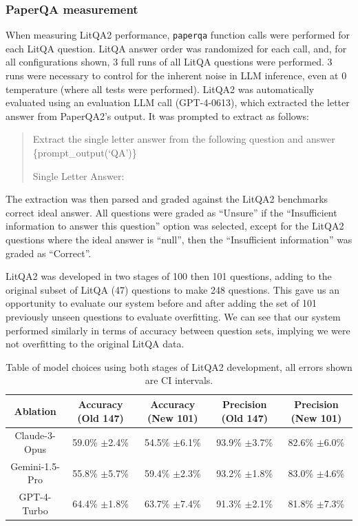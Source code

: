 \subsubsection{PaperQA measurement}
When measuring LitQA2 performance, \texttt{paperqa} function calls were performed for each LitQA question. LitQA answer order was randomized for each call, and, for all configurations shown, 3 full runs of all LitQA questions were performed. 3 runs were necessary to control for the inherent noise in LLM inference, even at 0 temperature (where all tests were performed).  LitQA2 was automatically evaluated using an evaluation LLM call (GPT-4-0613), which extracted the letter answer from PaperQA2's output. It was prompted to extract as follows: 

\begin{quote}
Extract the single letter answer from the following question and answer
\{prompt\_output(`QA')\}

Single Letter Answer:
\end{quote}

The extraction was then parsed and graded against the LitQA2 benchmarks correct ideal answer. All questions were graded as ``Unsure'' if the ``Insufficient information to answer this question'' option was selected, except for the LitQA2 questions where the ideal answer is ``null'', then the ``Insufficient information'' was graded as ``Correct''. 

LitQA2 was developed in two stages of 100 then 101 questions, adding to the original subset of LitQA (47) questions to make 248 questions. This gave us an opportunity to evaluate our system before and after adding the set of 101 previously unseen questions to evaluate overfitting. We can see that our system performed similarly in terms of accuracy between question sets, implying we were not overfitting to the original LitQA data. 

\begin{table}[h]
\centering
\begin{tabular}{|c|c|c|c|c|}
\hline
Ablation & Accuracy (Old 147) & Accuracy (New 101) & Precision (Old 147) & Precision (New 101) \\ \hline
Claude-3-Opus & 59.0\% $\pm $2.4\% & 54.5\% $\pm $6.1\% & 93.9\% $\pm $3.7\% & 82.6\% $\pm $6.0\% \\ \hline
Gemini-1.5-Pro & 55.8\% $\pm $5.7\% & 59.4\% $\pm $2.3\% & 93.2\% $\pm $1.8\% & 83.0\% $\pm $4.6\% \\ \hline
GPT-4-Turbo &  64.4\% $\pm $1.8\% & 63.7\% $\pm $7.4\% & 91.3\% $\pm $2.1\% & 81.8\% $\pm $7.3\% \\ \hline
\end{tabular}
\caption{Table of model choices using both stages of LitQA2 development, all errors shown are CI intervals.}
\label{tab:litqa_before_after}
\end{table}


